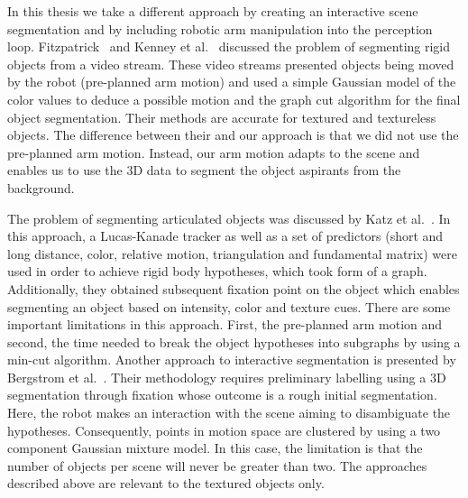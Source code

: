 In this thesis we take a different approach by creating an interactive scene segmentation and by including robotic arm manipulation into the perception loop. Fitzpatrick~\cite{fitzpatrick_active_vision} and Kenney et al.~\cite{KenneyInteractive} discussed the problem of segmenting rigid objects from a video stream. These video streams presented objects being moved by the robot (pre-planned arm motion) and used a simple Gaussian model of the color values to deduce a possible motion and the graph cut algorithm for the final object segmentation. Their methods are accurate for textured and textureless objects. The difference between their and our approach is that we did not use the pre-planned arm motion. Instead, our arm motion adapts to the scene and enables us to use the 3D data to segment the object aspirants from the background.

The problem of segmenting articulated objects was discussed by Katz et al.~\cite{Katz-WS-MM-ICRA2011}. In this approach, a Lucas-Kanade tracker as well as a set of predictors (short and long distance, color, relative motion, triangulation and fundamental matrix) were used in order to achieve rigid body hypotheses, which took form of a graph. Additionally, they obtained subsequent fixation point on the object which enables segmenting an object based on intensity, color and texture cues. There are some important limitations in this approach. First, the pre-planned arm motion and second, the time needed to break the object hypotheses into subgraphs by using a min-cut algorithm. 
Another approach to interactive segmentation is presented by Bergstrom et al.~\cite{bergstrom11icvs}. Their methodology requires preliminary labelling using a 3D segmentation through fixation whose outcome is a rough initial segmentation. Here, the robot makes an interaction with the scene aiming to disambiguate the hypotheses. Consequently, points in motion space are clustered by using a two component Gaussian mixture model. In this case, the limitation is that the number of objects per scene will never be greater than two.
The approaches described above are relevant to the textured objects only. 

